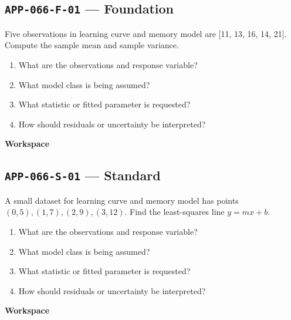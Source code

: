 \documentclass[11pt]{book}
\newcommand{\pid}[1]{\texttt{#1}}
\newcommand{\workspace}{\par\vspace{0.7in}\hrulefill\par\vspace{0.55in}\hrulefill\par}
\begin{document}
\subsection*{\pid{APP-066-F-01} — Foundation}
\begin{problembox}
Five observations in learning curve and memory model are [11, 13, 16, 14, 21]. Compute the sample mean and sample variance.
\end{problembox}
\begin{promptbox}\begin{enumerate}
\item What are the observations and response variable?
\item What model class is being assumed?
\item What statistic or fitted parameter is requested?
\item How should residuals or uncertainty be interpreted?
\end{enumerate}\end{promptbox}
\textbf{Workspace}\workspace
{}
\subsection*{\pid{APP-066-S-01} — Standard}
\begin{problembox}
A small dataset for learning curve and memory model has points $(0,5),(1,7),(2,9),(3,12)$. Find the least-squares line $y=mx+b$.
\end{problembox}
\begin{promptbox}\begin{enumerate}
\item What are the observations and response variable?
\item What model class is being assumed?
\item What statistic or fitted parameter is requested?
\item How should residuals or uncertainty be interpreted?
\end{enumerate}\end{promptbox}
\textbf{Workspace}\workspace
{}
\end{document}
